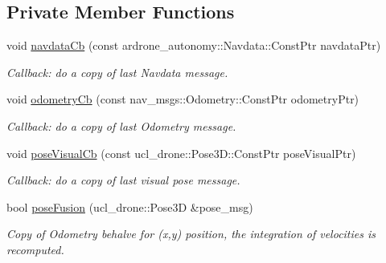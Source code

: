 \subsection*{Private Member Functions}
\begin{DoxyCompactItemize}
\item 
\mbox{\label{classPoseEstimator_a344d9a481663cdadda7a89862c1359c8}} 
void \hyperlink{classPoseEstimator_a344d9a481663cdadda7a89862c1359c8}{navdata\+Cb} (const ardrone\+\_\+autonomy\+::\+Navdata\+::\+Const\+Ptr navdata\+Ptr)
\begin{DoxyCompactList}\small\item\em Callback\+: do a copy of last Navdata message. \end{DoxyCompactList}\item 
\mbox{\label{classPoseEstimator_ac651cb76898cd29654ac15733820b81b}} 
void \hyperlink{classPoseEstimator_ac651cb76898cd29654ac15733820b81b}{odometry\+Cb} (const nav\+\_\+msgs\+::\+Odometry\+::\+Const\+Ptr odometry\+Ptr)
\begin{DoxyCompactList}\small\item\em Callback\+: do a copy of last Odometry message. \end{DoxyCompactList}\item 
\mbox{\label{classPoseEstimator_afa8fb8525cbb015f7d8e6b6bdf8a0f7c}} 
void \hyperlink{classPoseEstimator_afa8fb8525cbb015f7d8e6b6bdf8a0f7c}{pose\+Visual\+Cb} (const ucl\+\_\+drone\+::\+Pose3\+D\+::\+Const\+Ptr pose\+Visual\+Ptr)
\begin{DoxyCompactList}\small\item\em Callback\+: do a copy of last visual pose message. \end{DoxyCompactList}\item 
\mbox{\label{classPoseEstimator_a2efff8393b8a32ff5bf6909353d9a1d6}} 
bool \hyperlink{classPoseEstimator_a2efff8393b8a32ff5bf6909353d9a1d6}{pose\+Fusion} (ucl\+\_\+drone\+::\+Pose3D \&pose\+\_\+msg)
\begin{DoxyCompactList}\small\item\em Copy of Odometry behalve for (x,y) position, the integration of velocities is recomputed. \end{DoxyCompactList}\item 
\mbox{\label{classPoseEstimator_ace23bcfb7a0c364d6002ea90b230c89c}} 

\end{DoxyCompactItemize}
